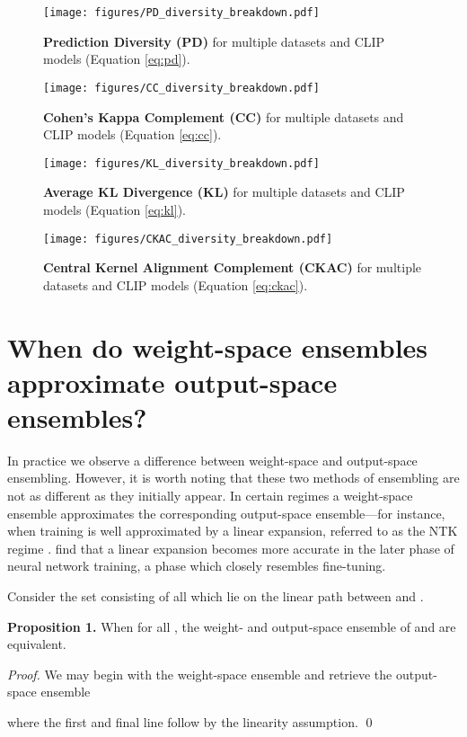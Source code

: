 \FloatBarrier

\begin{figure*}
    \centering
    \texttt{[image: figures/PD\_diversity\_breakdown.pdf]}
    \caption{\textbf{Prediction Diversity (PD)} for multiple datasets and CLIP models (Equation \ref {eq:pd}).}
    \label{fig:diversity_breakdown_start}
\end{figure*}

\begin{figure*}
    \centering
    \texttt{[image: figures/CC\_diversity\_breakdown.pdf]}
    \caption{\textbf{Cohen's Kappa Complement (CC)} for multiple datasets and CLIP models (Equation \ref {eq:cc}).}
\end{figure*}

\begin{figure*}
    \centering
    \texttt{[image: figures/KL\_diversity\_breakdown.pdf]}
    \caption{\textbf{Average KL Divergence (KL)} for multiple datasets and CLIP models (Equation \ref {eq:kl}).}
\end{figure*}


\begin{figure*}
    \centering
    \texttt{[image: figures/CKAC\_diversity\_breakdown.pdf]}
    \caption{\textbf{Central Kernel Alignment Complement (CKAC)} for multiple datasets and CLIP models (Equation \ref {eq:ckac}).}
    \label{fig:diversity_breakdown_end}
\end{figure*}

\FloatBarrier


\section{When do weight-space ensembles approximate output-space ensembles?}\label{sec:ntk}

In practice we observe a difference between weight-space and output-space ensembling. 
However, it is worth noting that these two methods of ensembling are not as different as they initially appear. In certain regimes a weight-space ensemble approximates the corresponding output-space ensemble---for instance, when training is well approximated by a linear expansion, referred to as the 
NTK regime \cite{jacot2018neural}. \citet{fort2020deep} find that a linear expansion becomes more accurate in the later phase of neural network training, a phase which closely resembles fine-tuning. 


Consider the set  consisting of all  which lie on the linear path between  and .

\textbf{Proposition 1.} When  for all , the weight- and output-space ensemble of  and  are equivalent.

\textit{Proof.} We may begin with the weight-space ensemble and retrieve the output-space ensemble

where the first and final line follow by the linearity assumption. \qed



 











